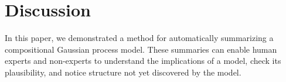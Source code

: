 \documentclass{article} %
\def\eg{e.g.\ }
\begin{document}


\section{Discussion}



In this paper, we demonstrated a method for automatically summarizing a compositional Gaussian process model.  These summaries can enable human experts and non-experts to understand the implications of a model, check its plausibility, and notice structure not yet discovered by the model.




\end{document}

